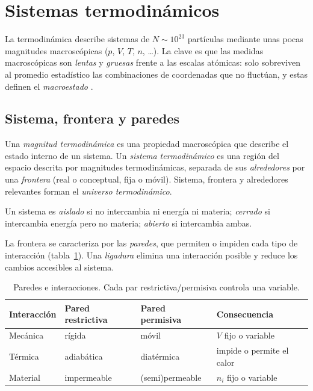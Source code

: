 \section{Sistemas termodinámicos}
La termodinámica describe sistemas de $N\sim10^{23}$ partículas mediante unas pocas magnitudes
macroscópicas ($p$, $V$, $T$, $n$, \dots). La clave es que las medidas macroscópicas son \emph{lentas} y
\emph{gruesas} frente a las escalas atómicas: solo sobreviven al promedio estadístico las combinaciones
de coordenadas que no fluctúan, y estas definen el \emph{macroestado} \cite{gonzalez1,gonzalez2}.

\subsection{Sistema, frontera y paredes}

\begin{definicion}
Una \emph{magnitud termodinámica} es una propiedad macroscópica que describe el estado interno de un
sistema. Un \emph{sistema termodinámico} es una región del espacio descrita por magnitudes
termodinámicas, separada de sus \emph{alrededores} por una \emph{frontera} (real o conceptual, fija o
móvil). Sistema, frontera y alrededores relevantes forman el \emph{universo termodinámico}.
\end{definicion}

\begin{definicion}
Un sistema es \emph{aislado} si no intercambia ni energía ni materia; \emph{cerrado} si intercambia
energía pero no materia; \emph{abierto} si intercambia ambas.
\end{definicion}

La frontera se caracteriza por las \emph{paredes}, que permiten o impiden cada tipo de interacción
(tabla~\ref{tab:paredes}). Una \emph{ligadura} elimina una interacción posible y reduce los cambios
accesibles al sistema.

\begin{table}[htbp]
\centering
\caption{Paredes e interacciones. Cada par restrictiva/permisiva controla una variable.}
\label{tab:paredes}
\small
\begin{tabular}{llll}
\toprule
Interacción & Pared restrictiva & Pared permisiva & Consecuencia\\
\midrule
Mecánica & rígida & móvil & $V$ fijo o variable\\
Térmica & adiabática & diatérmica & impide o permite el calor\\
Material & impermeable & (semi)permeable & $n_i$ fijo o variable\\
\bottomrule
\end{tabular}
\end{table}

